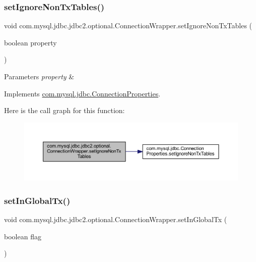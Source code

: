 \subsubsection{\texorpdfstring{set\+Ignore\+Non\+Tx\+Tables()}{setIgnoreNonTxTables()}}
{\footnotesize\ttfamily void com.\+mysql.\+jdbc.\+jdbc2.\+optional.\+Connection\+Wrapper.\+set\+Ignore\+Non\+Tx\+Tables (\begin{DoxyParamCaption}\item[{boolean}]{property }\end{DoxyParamCaption})}


\begin{DoxyParams}{Parameters}
{\em property} & \\
\hline
\end{DoxyParams}


Implements \mbox{\hyperlink{interfacecom_1_1mysql_1_1jdbc_1_1_connection_properties_aef7c4c2447c9875392d6dff3452d9ac2}{com.\+mysql.\+jdbc.\+Connection\+Properties}}.

Here is the call graph for this function\+:
\nopagebreak
\begin{figure}[H]
\begin{center}
\leavevmode
\includegraphics[width=350pt]{classcom_1_1mysql_1_1jdbc_1_1jdbc2_1_1optional_1_1_connection_wrapper_a67f86e88b0cdc508024a59978cc255af_cgraph}
\end{center}
\end{figure}
\mbox{\label{classcom_1_1mysql_1_1jdbc_1_1jdbc2_1_1optional_1_1_connection_wrapper_ad2b00fa8ecb1c3455f2f2725ca9fc29c}} 
\subsubsection{\texorpdfstring{set\+In\+Global\+Tx()}{setInGlobalTx()}}
{\footnotesize\ttfamily void com.\+mysql.\+jdbc.\+jdbc2.\+optional.\+Connection\+Wrapper.\+set\+In\+Global\+Tx (\begin{DoxyParamCaption}\item[{boolean}]{flag }\end{DoxyParamCaption})}

